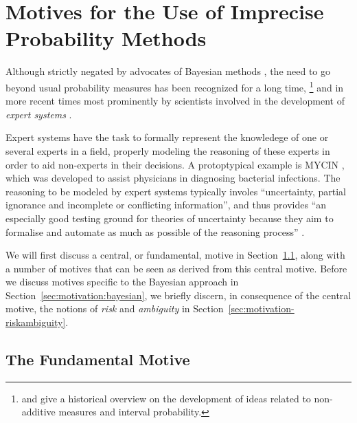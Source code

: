 \section{Motives for the Use of Imprecise Probability Methods}
\label{sec:motivation}

Although strictly negated by advocates of Bayesian methods \parencite[e.g., by][]{1987:lindley},
the need to go beyond usual probability measures has been recognized for a long time,%
\footnote{\textcite{2009:hampel} and \textcite[\S 1]{2001:weichselberger} give a historical overview on the development of
ideas related to non-additive measures and interval probability.}
and in more recent times most prominently by scientists involved in the development of \emph{expert systems}
\parencite[see, e.g.,][]{1996:walley::expert}.%

Expert systems have the task to formally represent the knowledege of one or several experts in a field,
properly modeling the reasoning of these experts in order to aid non-experts in their decisions.
A protoptypical example is MYCIN \parencite{1976:shortliffe},
which was developed to assist physicians in diagnosing bacterial infections.
The reasoning to be modeled by expert systems typically involes
``uncertainty, partial ignorance and incomplete or conflicting information'', and thus provides
``an especially good testing ground for theories of uncertainty
because they aim to formalise and automate as much as possible
of the reasoning process'' \parencite[p.~2]{1996:walley::expert}.

We will first discuss a central, or fundamental, motive in Section~\ref{sec:motivation-fundamental},
along with a number of motives that can be seen as derived from this central motive.
Before we discuss motives specific to the Bayesian approach in Section~\ref{sec:motivation:bayesian},
we briefly discern, in consequence of the central motive, the notions of \emph{risk} and \emph{ambiguity}
in Section~\ref{sec:motivation-riskambiguity}.

\subsection{The Fundamental Motive}
\label{sec:motivation-fundamental}

